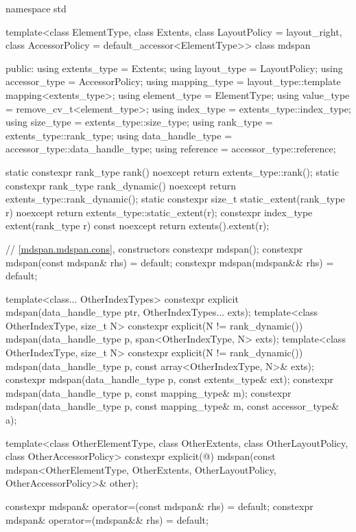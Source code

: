 \begin{codeblock}
namespace std {
  template<class ElementType, class Extents, class LayoutPolicy = layout_right,
           class AccessorPolicy = default_accessor<ElementType>>
  class mdspan {
  public:
    using extents_type = Extents;
    using layout_type = LayoutPolicy;
    using accessor_type = AccessorPolicy;
    using mapping_type = layout_type::template mapping<extents_type>;
    using element_type = ElementType;
    using value_type = remove_cv_t<element_type>;
    using index_type = extents_type::index_type;
    using size_type = extents_type::size_type;
    using rank_type = extents_type::rank_type;
    using data_handle_type = accessor_type::data_handle_type;
    using reference = accessor_type::reference;

    static constexpr rank_type rank() noexcept { return extents_type::rank(); }
    static constexpr rank_type rank_dynamic() noexcept { return extents_type::rank_dynamic(); }
    static constexpr size_t static_extent(rank_type r) noexcept
      { return extents_type::static_extent(r); }
    constexpr index_type extent(rank_type r) const noexcept { return extents().extent(r); }

    // \ref{mdspan.mdspan.cons}, constructors
    constexpr mdspan();
    constexpr mdspan(const mdspan& rhs) = default;
    constexpr mdspan(mdspan&& rhs) = default;

    template<class... OtherIndexTypes>
      constexpr explicit mdspan(data_handle_type ptr, OtherIndexTypes... exts);
    template<class OtherIndexType, size_t N>
      constexpr explicit(N != rank_dynamic())
        mdspan(data_handle_type p, span<OtherIndexType, N> exts);
    template<class OtherIndexType, size_t N>
      constexpr explicit(N != rank_dynamic())
        mdspan(data_handle_type p, const array<OtherIndexType, N>& exts);
    constexpr mdspan(data_handle_type p, const extents_type& ext);
    constexpr mdspan(data_handle_type p, const mapping_type& m);
    constexpr mdspan(data_handle_type p, const mapping_type& m, const accessor_type& a);

    template<class OtherElementType, class OtherExtents,
             class OtherLayoutPolicy, class OtherAccessorPolicy>
      constexpr explicit(@\seebelow@)
        mdspan(const mdspan<OtherElementType, OtherExtents,
                            OtherLayoutPolicy, OtherAccessorPolicy>& other);

    constexpr mdspan& operator=(const mdspan& rhs) = default;
    constexpr mdspan& operator=(mdspan&& rhs) = default;

}}
\end{codeblock}

